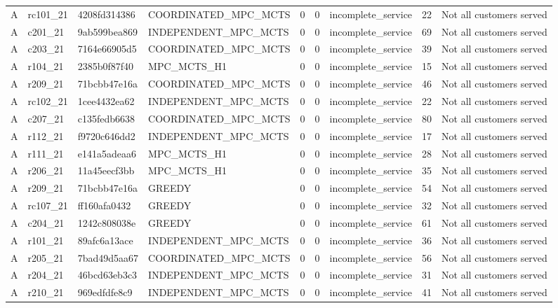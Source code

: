 \begin{table}
{\begin{tabular}{llllrrlrl}
A & rc101\_21 & 4208fd314386 & COORDINATED\_MPC\_MCTS & 0 & 0 & incomplete\_service & 22 & Not all customers served \\
A & c201\_21 & 9ab599bea869 & INDEPENDENT\_MPC\_MCTS & 0 & 0 & incomplete\_service & 69 & Not all customers served \\
A & c203\_21 & 7164e66905d5 & COORDINATED\_MPC\_MCTS & 0 & 0 & incomplete\_service & 39 & Not all customers served \\
A & r104\_21 & 2385b0f87f40 & MPC\_MCTS\_H1 & 0 & 0 & incomplete\_service & 15 & Not all customers served \\
A & r209\_21 & 71bcbb47e16a & COORDINATED\_MPC\_MCTS & 0 & 0 & incomplete\_service & 46 & Not all customers served \\
A & rc102\_21 & 1cee4432ea62 & INDEPENDENT\_MPC\_MCTS & 0 & 0 & incomplete\_service & 22 & Not all customers served \\
A & c207\_21 & c135fedb6638 & COORDINATED\_MPC\_MCTS & 0 & 0 & incomplete\_service & 80 & Not all customers served \\
A & r112\_21 & f9720c646dd2 & INDEPENDENT\_MPC\_MCTS & 0 & 0 & incomplete\_service & 17 & Not all customers served \\
A & r111\_21 & e141a5adeaa6 & MPC\_MCTS\_H1 & 0 & 0 & incomplete\_service & 28 & Not all customers served \\
A & r206\_21 & 11a45eecf3bb & MPC\_MCTS\_H1 & 0 & 0 & incomplete\_service & 35 & Not all customers served \\
A & r209\_21 & 71bcbb47e16a & GREEDY & 0 & 0 & incomplete\_service & 54 & Not all customers served \\
A & rc107\_21 & ff160afa0432 & GREEDY & 0 & 0 & incomplete\_service & 32 & Not all customers served \\
A & c204\_21 & 1242c808038e & GREEDY & 0 & 0 & incomplete\_service & 61 & Not all customers served \\
A & r101\_21 & 89afc6a13ace & INDEPENDENT\_MPC\_MCTS & 0 & 0 & incomplete\_service & 36 & Not all customers served \\
A & r205\_21 & 7bad49d5aa67 & COORDINATED\_MPC\_MCTS & 0 & 0 & incomplete\_service & 56 & Not all customers served \\
A & r204\_21 & 46bcd63eb3c3 & INDEPENDENT\_MPC\_MCTS & 0 & 0 & incomplete\_service & 31 & Not all customers served \\
A & r210\_21 & 969edfdfe8c9 & INDEPENDENT\_MPC\_MCTS & 0 & 0 & incomplete\_service & 41 & Not all customers served \\

\end{tabular}}
\end{table}
